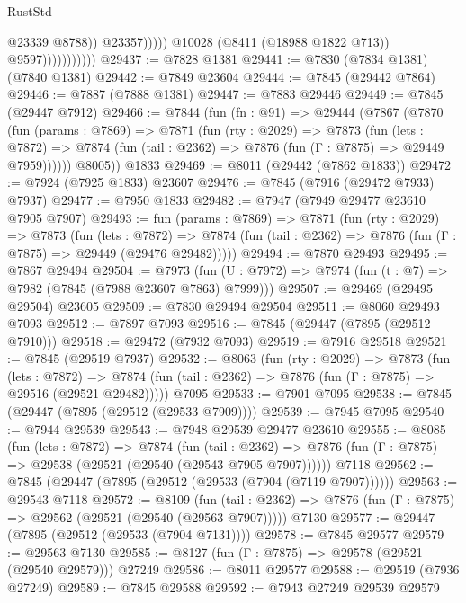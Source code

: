\begin{lexlean}{RustStd}
\begin{coremodule}
                                        @23339
                                        @8788))
                                    @23357)))))
                          @10028
                          (@8411 (@18988 @1822 @713))
                          @9597)))))))))))
@29437 := @7828 @1381
@29441 := @7830 (@7834 @1381) (@7840 @1381)
@29442 := @7849 @23604
@29444 := @7845 (@29442 @7864)
@29446 := @7887 (@7888 @1381)
@29447 := @7883 @29446
@29449 := @7845 (@29447 @7912)
@29466 := @7844
    (fun (fn : @91) =>
    @29444
      (@7867
        (@7870
          (fun (params : @7869) =>
          @7871
            (fun (rty : @2029) =>
            @7873
              (fun (lets : @7872) =>
              @7874 (fun (tail : @2362) => @7876 (fun (Γ : @7875) => @29449 @7959))))))
        @8005))
    @1833
@29469 := @8011 (@29442 (@7862 @1833))
@29472 := @7924 (@7925 @1833) @23607
@29476 := @7845 (@7916 (@29472 @7933) @7937)
@29477 := @7950 @1833
@29482 := @7947 (@7949 @29477 @23610 @7905 @7907)
@29493 := fun (params : @7869) =>
  @7871
    (fun (rty : @2029) =>
    @7873
      (fun (lets : @7872) =>
      @7874 (fun (tail : @2362) => @7876 (fun (Γ : @7875) => @29449 (@29476 @29482)))))
@29494 := @7870 @29493
@29495 := @7867 @29494
@29504 := @7973
    (fun (U : @7972) => @7974 (fun (t : @7) => @7982 (@7845 (@7988 @23607 @7863) @7999)))
@29507 := @29469 (@29495 @29504) @23605
@29509 := @7830 @29494 @29504
@29511 := @8060 @29493 @7093
@29512 := @7897 @7093
@29516 := @7845 (@29447 (@7895 (@29512 @7910)))
@29518 := @29472 (@7932 @7093)
@29519 := @7916 @29518
@29521 := @7845 (@29519 @7937)
@29532 := @8063
    (fun (rty : @2029) =>
    @7873
      (fun (lets : @7872) =>
      @7874 (fun (tail : @2362) => @7876 (fun (Γ : @7875) => @29516 (@29521 @29482)))))
    @7095
@29533 := @7901 @7095
@29538 := @7845 (@29447 (@7895 (@29512 (@29533 @7909))))
@29539 := @7945 @7095
@29540 := @7944 @29539
@29543 := @7948 @29539 @29477 @23610
@29555 := @8085
    (fun (lets : @7872) =>
    @7874
      (fun (tail : @2362) =>
      @7876 (fun (Γ : @7875) => @29538 (@29521 (@29540 (@29543 @7905 @7907))))))
    @7118
@29562 := @7845 (@29447 (@7895 (@29512 (@29533 (@7904 (@7119 @7907))))))
@29563 := @29543 @7118
@29572 := @8109
    (fun (tail : @2362) => @7876 (fun (Γ : @7875) => @29562 (@29521 (@29540 (@29563 @7907)))))
    @7130
@29577 := @29447 (@7895 (@29512 (@29533 (@7904 @7131))))
@29578 := @7845 @29577
@29579 := @29563 @7130
@29585 := @8127 (fun (Γ : @7875) => @29578 (@29521 (@29540 @29579))) @27249
@29586 := @8011 @29577
@29588 := @29519 (@7936 @27249)
@29589 := @7845 @29588
@29592 := @7943 @27249 @29539 @29579

\end{coremodule}
\end{lexlean}
